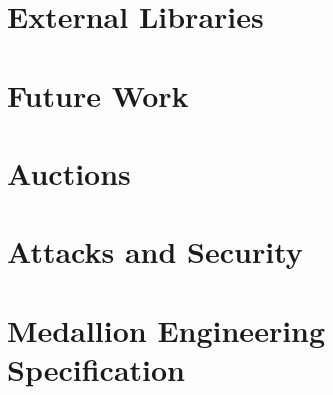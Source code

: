 \documentclass{article}
\begin{document}
    \section{External Libraries}
    \label{sec:external-libraries}
    

    
    \section{Future Work}
    \label{sec:future}
    

\newpage

\printbibliography

\newpage

\appendix

	\newpage
    \section{Auctions}
    \label{sec:auctions}
    
	
    \newpage
    \section{Attacks and Security}
    \label{sec:attacksappendix}
    

	\newpage
    \section{Medallion Engineering Specification}
    \label{medallionspow}
    
\end{document}
